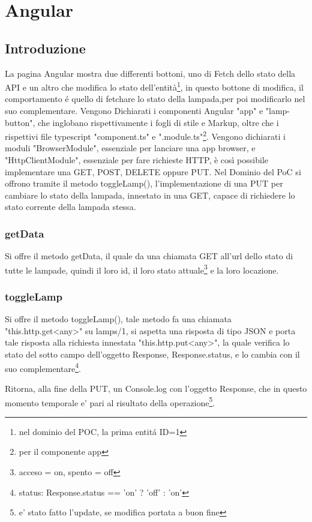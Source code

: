 \chapter{Angular}\label{angular}

\section{Introduzione}

La pagina Angular mostra due differenti bottoni, uno di Fetch dello stato della API e un altro che modifica lo stato dell'entità\footnote{nel dominio del POC, la prima entitá ID=1}, in questo bottone di modifica, il comportamento é quello di fetchare lo stato della lampada,per poi modificarlo nel suo complementare.
Vengono Dichiarati i componenti Angular "app" e "lamp-button", che inglobano rispettivamente i fogli di stile e Markup, oltre che i rispettivi file typescript "component.ts" e ".module.ts"\footnote{per il componente app}. 
Vengono dichiarati i moduli "BrowserModule", essenziale per lanciare una app browser, e "HttpClientModule", essenziale per fare richieste HTTP, è così possibile implementare una GET, POST, DELETE oppure PUT.
Nel Dominio del PoC si offrono tramite il metodo toggleLamp(), l'implementazione di una PUT per cambiare lo stato della lampada, innestato in una GET, capace di richiedere lo stato corrente della lampada stessa.

\subsection{getData}

Si offre il metodo getData, il quale da una chiamata GET all'url dello stato di tutte le lampade, quindi il loro id, il loro stato attuale\footnote{acceso = on, spento = off} e la loro locazione.

\subsection{toggleLamp}

Si offre il metodo toggleLamp(), tale metodo fa una chiamata "this.http.get<any>" su lamps/1, si aspetta una risposta di tipo JSON e porta tale risposta alla richiesta innestata "this.http.put<any>", la quale verifica lo stato del sotto campo dell'oggetto Response, Response.status, e lo cambia con il suo complementare\footnote{status: Response.status == 'on' ? 'off' : 'on'}.

Ritorna, alla fine della PUT, un Console.log con l'oggetto Response, che in questo momento temporale e' pari al risultato della operazione\footnote{e' stato fatto l'update, se modifica portata a buon fine}.


